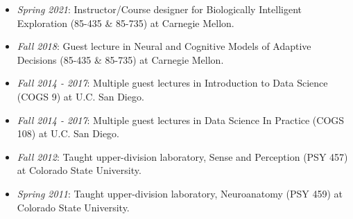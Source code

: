 \begin{itemize}
\tightlist
\item
  \emph{Spring 2021}: Instructor/Course designer for Biologically
  Intelligent Exploration (85-435 \& 85-735) at Carnegie Mellon.
\item
  \emph{Fall 2018}: Guest lecture in Neural and Cognitive Models of
  Adaptive Decisions (85-435 \& 85-735) at Carnegie Mellon.
\item
  \emph{Fall 2014 - 2017}: Multiple guest lectures in Introduction to
  Data Science (COGS 9) at U.C. San Diego.
\item
  \emph{Fall 2014 - 2017}: Multiple guest lectures in Data Science In
  Practice (COGS 108) at U.C. San Diego.
\item
  \emph{Fall 2012}: Taught upper-division laboratory, Sense and
  Perception (PSY 457) at Colorado State University.
\item
  \emph{Spring 2011}: Taught upper-division laboratory, Neuroanatomy
  (PSY 459) at Colorado State University.
\end{itemize}
